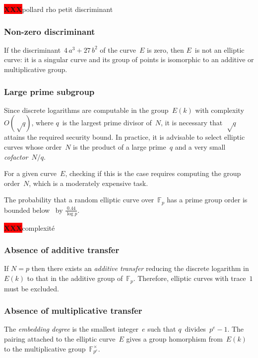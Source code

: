\documentclass{article}
\def\F{\mathbb{F}}
\def\XXX{{\colorbox{red}{{\color{white}\bfseries XXX}}}}
\begin{document}
\XXX pollard rho petit discriminant

\label{ss:dlp}
\subsubsection{Non-zero discriminant}

If the discriminant~$4\, a^3 + 27\,b^2$
of the curve~$E$ is zero, then $E$~is not an elliptic curve:
it is a singular curve and its group of points is isomorphic to
an additive or multiplicative group.

\subsubsection{Large prime subgroup}

Since discrete logarithms are computable in the group~$E(k)$
with complexity~$O(√q)$, where $q$~is the largest prime divisor of~$N$,
it is necessary that~$√q$ attains the required security bound.
In practice, it is advisable to select elliptic curves whose order~$N$
is the product of a large prime~$q$
and a very small \emph{cofactor}~$N/q$.

For a given curve~$E$, checking if this is the case
requires computing the group order~$N$,
which is a moderately expensive task.

The probability that a random elliptic curve over~$\F_p$
has a prime group order is bounded below~\cite{lms2000gm}
by $\frac{0.44}{\log p}$.

\XXX complexité

\subsubsection{Absence of additive transfer}

If $N = p$ then there exists an \emph{additive transfer}
reducing the discrete logarithm in~$E(k)$
to that in the additive group of~$\F_p$.
Therefore, elliptic curves with trace~$1$ must be excluded.

\subsubsection{Absence of multiplicative transfer}

The \emph{embedding degree} is the smallest integer~$e$ such that
$q$~divides~$p^e -1$.
The pairing attached to the elliptic curve~$E$
gives a group homorphism from~$E(k)$
to the multiplicative group~$\F_{p^e}^{×}$.
\end{document}
